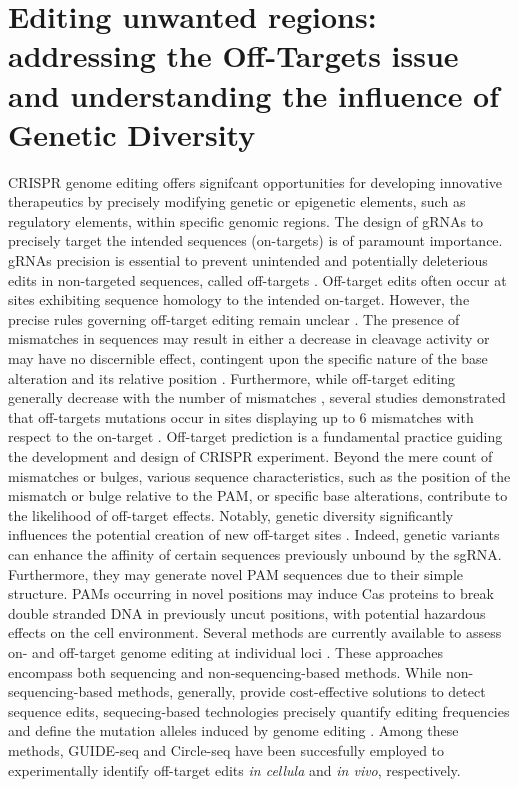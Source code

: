 \documentclass[a4paper, titlepage, openright]{book}
\begin{document}
\section{Editing unwanted regions: addressing the Off-Targets issue and understanding the influence of Genetic Diversity}
CRISPR genome editing offers signifcant opportunities for developing innovative therapeutics by precisely modifying genetic or epigenetic elements, such as regulatory elements, within specific genomic regions. The design of gRNAs to precisely target the intended sequences (on-targets) is of paramount importance. gRNAs precision is essential to prevent unintended and potentially deleterious edits in non-targeted sequences, called off-targets \citep{pattanayak2013high,cho2014analysis}. Off-target edits often occur at sites exhibiting sequence homology to the intended on-target. However, the precise rules governing off-target editing remain unclear \citep{tycko2016methods}. The presence of mismatches in sequences may result in either a decrease in cleavage activity or may have no discernible effect, contingent upon the specific nature of the base alteration and its relative position \citep{doench2014rational,doench2016optimized}. Furthermore, while off-target editing generally decrease with the number of mismatches \citep{cho2014analysis}, several studies demonstrated that off-targets mutations occur in sites displaying up to 6 mismatches with respect to the on-target \citep{tsai2015guide}. Off-target prediction is a fundamental practice guiding the development and design of CRISPR experiment. Beyond the mere count of mismatches or bulges, various sequence characteristics, such as the position of the mismatch or bulge relative to the PAM, or specific base alterations, contribute to the likelihood of off-target effects. Notably, genetic diversity significantly influences the potential creation of new off-target sites \citep{scott2017implications}. Indeed, genetic variants can enhance the affinity of certain sequences previously unbound by the sgRNA. Furthermore, they may generate novel PAM sequences due to their simple structure. PAMs occurring in novel positions may induce Cas proteins to break double stranded DNA in previously uncut positions, with potential hazardous effects on the cell environment. Several methods are currently available to assess on- and off-target genome editing at individual loci \citep{clement2020technologies}. These approaches encompass both sequencing and non-sequencing-based methods. While non-sequencing-based methods, generally, provide cost-effective solutions to detect sequence edits, sequecing-based technologies precisely quantify editing frequencies and define the mutation alleles induced by genome editing \citep{clement2020technologies}. Among these methods, GUIDE-seq \citep{tsai2015guide} and Circle-seq \citep{tsai2017circle} have been succesfully employed to experimentally identify off-target edits \emph{in cellula} and \emph{in vivo}, respectively.  
\end{document}
